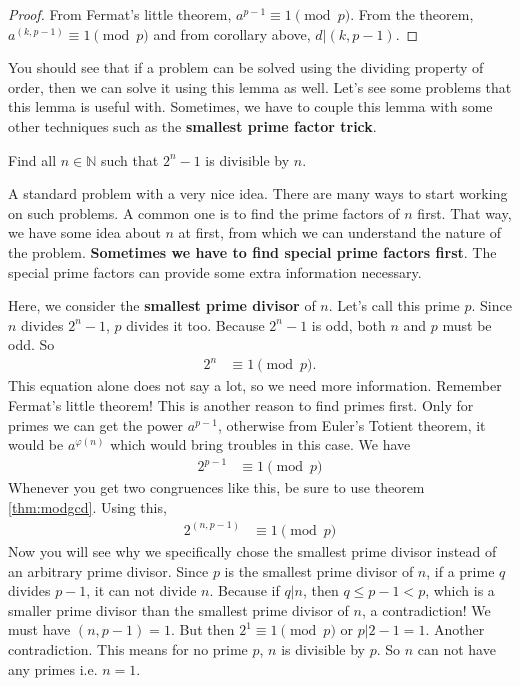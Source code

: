 \documentclass{subfile}
\begin{document}
		\begin{proof}
			From Fermat's little theorem, $a^{p-1}\equiv1\pmod p$. From the theorem, $a^{(k,p-1)}\equiv1\pmod p$ and from corollary above, $d|(k,p-1)$.
		\end{proof}
	You should see that if a problem can be solved using the dividing property of order, then we can solve it using this lemma as well. Let's see some problems that this lemma is useful with. Sometimes, we have to couple this lemma with some other techniques such as the \textbf{smallest prime factor trick}.
	
	\begin{problem}
		Find all $n\in\mathbb{N}$ such that $2^n-1$ is divisible by $n$.
	\end{problem}
	A standard problem with a very nice idea. There are many ways to start working on such problems. A common one is to find the prime factors of $n$ first. That way, we have some idea about $n$ at first, from which we can understand the nature of the problem. \textbf{Sometimes we have to find special prime factors first}. The special prime factors can provide some extra information necessary.
	\begin{solution}
		Here, we consider the \textbf{smallest prime divisor} of $n$. Let's call this prime $p$. Since $n$ divides $2^n-1$, $p$ divides it too. Because $2^n-1$ is odd, both $n$ and $p$ must be odd. So
		\begin{align*}
			2^n & \equiv1\pmod p.
		\end{align*}
		This equation alone does not say a lot, so we need more information. Remember Fermat's little theorem! This is another reason to find primes first. Only for primes we can get the power $a^{p-1}$, otherwise from Euler's Totient theorem, it would be $a^{\varphi(n)}$ which would bring troubles in this case. We have
		\begin{align*}
			2^{p-1} & \equiv1\pmod p
		\end{align*}
		Whenever you get two congruences like this, be sure to use theorem \eqref{thm:modgcd}. Using this,
		\begin{align*}
			2^{(n,p-1)} & \equiv1\pmod p
		\end{align*}
		Now you will see why we specifically chose the smallest prime divisor instead of an arbitrary prime divisor. Since $p$ is the smallest prime divisor of $n$, if a prime $q$ divides $p-1$, it can not divide $n$. Because if $q|n$, then $q\leq p-1<p$, which is a smaller prime divisor than the smallest prime divisor of $n$, a contradiction! We must have $(n,p-1)=1$. But then $2^1\equiv1\pmod p$ or $p|2-1=1$. Another contradiction. This means for no prime $p$, $n$ is divisible by $p$. So $n$ can  not have any primes i.e. $n=1$.
	\end{solution}
	
\end{document}
